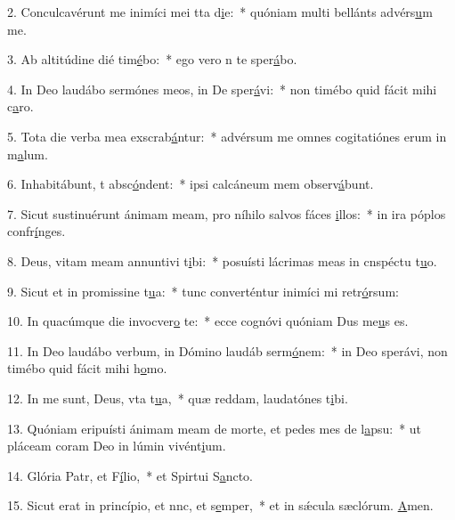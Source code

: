 2. Conculcavérunt me inimíci mei tta d\uline{i}e:~* quóniam multi bellánts advérs\uline{u}m me.\par 
3. Ab altitúdine dié tim\uline{é}bo:~* ego vero n te sper\uline{á}bo.\par 
4. In Deo laudábo sermónes meos, in De sper\uline{á}vi:~* non timébo quid fácit mihi c\uline{a}ro.\par 
5. Tota die verba mea exscrab\uline{á}ntur:~* advérsum me omnes cogitatiónes erum in m\uline{a}lum.\par 
6. Inhabitábunt, t absc\uline{ó}ndent:~* ipsi calcáneum mem observ\uline{á}bunt.\par 
7. Sicut sustinuérunt ánimam meam, pro níhilo salvos fáces \uline{i}llos:~* in ira póplos confr\uline{í}nges.\par 
8. Deus, vitam meam annuntivi t\uline{i}bi:~* posuísti lácrimas meas in cnspéctu t\uline{u}o.\par 
9. Sicut et in promissine t\uline{u}a:~* tunc converténtur inimíci mi retr\uline{ó}rsum:\par 
10. In quacúmque die invocver\uline{o} te:~* ecce cognóvi quóniam Dus me\uline{u}s es.\par 
11. In Deo laudábo verbum, in Dómino laudáb serm\uline{ó}nem:~* in Deo sperávi, non timébo quid fácit mihi h\uline{o}mo.\par 
12. In me sunt, Deus, vta t\uline{u}a,~* quæ reddam, laudatónes t\uline{i}bi.\par 
13. Quóniam eripuísti ánimam meam de morte, et pedes mes de l\uline{a}psu:~* ut pláceam coram Deo in lúmin vivént\uline{i}um.\par 
14. Glória Patr, et F\uline{í}lio,~* et Spirtui S\uline{a}ncto.\par 
15. Sicut erat in princípio, et nnc, et s\uline{e}mper,~* et in sǽcula sæclórum. \uline{A}men.\par 
